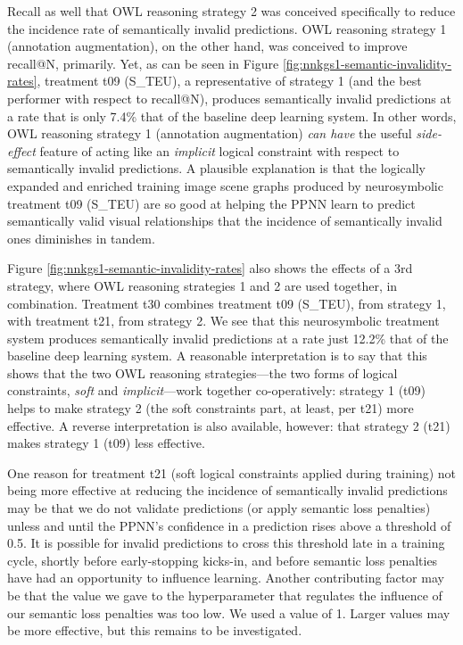 \documentclass[]{jair}
\begin{document}
Recall as well that OWL reasoning strategy 2 was conceived specifically to reduce the incidence rate of semantically invalid predictions.
OWL reasoning strategy 1 (annotation augmentation), on the other hand, was conceived to improve recall@N, primarily.
Yet, as can be seen in Figure \ref{fig:nnkgs1-semantic-invalidity-rates}, treatment t09 (S\_TEU), a representative of strategy 1 (and the best performer with respect to recall@N), produces semantically invalid predictions at a rate that is only 7.4\% that of the baseline deep learning system.
In other words, OWL reasoning strategy 1 (annotation augmentation) \emph{can have} 
the useful \emph{side-effect} feature of acting like an \emph{implicit} logical constraint with respect to semantically invalid predictions.
A plausible explanation is that the logically expanded and enriched training image scene graphs produced by neurosymbolic treatment t09 (S\_TEU) are so good at helping the PPNN learn to predict semantically valid visual relationships that the incidence of semantically invalid ones diminishes in tandem.

Figure \ref{fig:nnkgs1-semantic-invalidity-rates} also shows the effects of a 3rd strategy, where OWL reasoning strategies 1 and 2 are used together, in combination.
Treatment t30 combines treatment t09 (S\_TEU), from strategy 1, with treatment t21, from strategy 2.
We see that this neurosymbolic treatment system produces semantically invalid predictions at a rate just 12.2\% that of the baseline deep learning system.
A reasonable interpretation is to say that this shows that the two OWL reasoning strategies---the two forms of logical constraints, \emph{soft} and \emph{implicit}---work together co-operatively: strategy 1 (t09) helps to make strategy 2 (the soft constraints part, at least, per t21) more effective.
A reverse interpretation is also available, however: that strategy 2 (t21) makes strategy 1 (t09) less effective.

One reason for treatment t21 (soft logical constraints applied during training) not being more effective at reducing the incidence of semantically invalid predictions may be that we do not validate predictions (or apply semantic loss penalties) unless and until the PPNN's confidence in a prediction rises above a threshold of 0.5.
It is possible for invalid predictions to cross this threshold late in a training cycle, shortly before early-stopping kicks-in, and before semantic loss penalties have had an opportunity to influence learning.
Another contributing factor may be that the value we gave to the hyperparameter that regulates the influence of our semantic loss penalties was too low.
We used a value of 1.
Larger values may be more effective, but this remains to be investigated.
\end{document}
